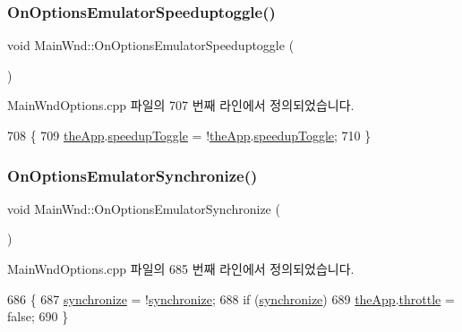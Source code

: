 \subsubsection{\texorpdfstring{On\+Options\+Emulator\+Speeduptoggle()}{OnOptionsEmulatorSpeeduptoggle()}}
{\footnotesize\ttfamily void Main\+Wnd\+::\+On\+Options\+Emulator\+Speeduptoggle (\begin{DoxyParamCaption}{ }\end{DoxyParamCaption})\hspace{0.3cm}{\ttfamily [protected]}}



Main\+Wnd\+Options.\+cpp 파일의 707 번째 라인에서 정의되었습니다.


\begin{DoxyCode}
708 \{
709   \mbox{\hyperlink{_v_b_a_8cpp_a8095a9d06b37a7efe3723f3218ad8fb3}{theApp}}.\mbox{\hyperlink{class_v_b_a_aab299545104f6df869bf8f7abee6ef0a}{speedupToggle}} = !\mbox{\hyperlink{_v_b_a_8cpp_a8095a9d06b37a7efe3723f3218ad8fb3}{theApp}}.\mbox{\hyperlink{class_v_b_a_aab299545104f6df869bf8f7abee6ef0a}{speedupToggle}};
710 \}
\end{DoxyCode}
\mbox{\label{class_main_wnd_a7c06835a2c41f9999bd1ac57573b1ca5}} 
\subsubsection{\texorpdfstring{On\+Options\+Emulator\+Synchronize()}{OnOptionsEmulatorSynchronize()}}
{\footnotesize\ttfamily void Main\+Wnd\+::\+On\+Options\+Emulator\+Synchronize (\begin{DoxyParamCaption}{ }\end{DoxyParamCaption})\hspace{0.3cm}{\ttfamily [protected]}}



Main\+Wnd\+Options.\+cpp 파일의 685 번째 라인에서 정의되었습니다.


\begin{DoxyCode}
686 \{
687   \mbox{\hyperlink{_globals_8cpp_ac7839c270877c700179f026cb3217a6b}{synchronize}} = !\mbox{\hyperlink{_globals_8cpp_ac7839c270877c700179f026cb3217a6b}{synchronize}};
688   \textcolor{keywordflow}{if} (\mbox{\hyperlink{_globals_8cpp_ac7839c270877c700179f026cb3217a6b}{synchronize}})
689       \mbox{\hyperlink{_v_b_a_8cpp_a8095a9d06b37a7efe3723f3218ad8fb3}{theApp}}.\mbox{\hyperlink{class_v_b_a_af21b98509a2589b38e4787f065b40a2b}{throttle}} = \textcolor{keyword}{false};
690 \}
\end{DoxyCode}
\mbox{\label{class_main_wnd_a26ef871056784bfd1f22efd86dc96991}} 
